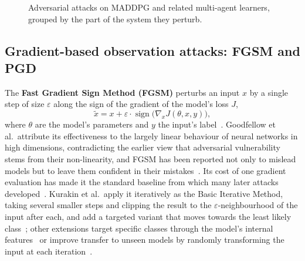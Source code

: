 \begin{figure}[htbp]
\caption{Adversarial attacks on MADDPG and related multi-agent learners, grouped by the
         part of the system they perturb.}
\label{fig:maddpg_attack_taxonomy}
\end{figure}

\subsection{Gradient-based observation attacks: FGSM and PGD}
\label{subsec:observation_attacks}

The \textbf{Fast Gradient Sign Method (FGSM)} perturbs an input $x$ by a single step of
size $\varepsilon$ along the sign of the gradient of the model's loss $J$,
\begin{equation}
\tilde{x} = x + \varepsilon \cdot \operatorname{sign}\big(\nabla_x J(\theta, x, y)\big),
\end{equation}
where $\theta$ are the model's parameters and $y$ the input's
label~\cite{goodfellow2015explainingharnessingadversarialexamples}. Goodfellow et al.\
attribute its effectiveness to the largely linear behaviour of neural networks in high
dimensions, contradicting the earlier view that adversarial vulnerability stems from
their non-linearity, and FGSM has been reported not only to mislead models but to leave
them confident in their mistakes~\cite{villegas2024evaluating}. Its cost of one gradient
evaluation has made it the standard baseline from which many later attacks
developed~\cite{akhtar2021advances}. Kurakin et al.\ apply it iteratively as the Basic
Iterative Method, taking several smaller steps and clipping the result to the
$\varepsilon$-neighbourhood of the input after each, and add a targeted variant that
moves towards the least likely class~\cite{kurakin2016adversarialexamplesphysicalworld};
other extensions target specific classes through the model's internal
features~\cite{rozsa2016adversarial} or improve transfer to unseen models by randomly
transforming the input at each iteration~\cite{Xie_2019_CVPR}.

